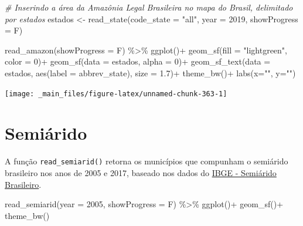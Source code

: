 \documentclass[
  brazilian,
]{book}
\newenvironment{Shaded}{\begin{snugshade}}{\end{snugshade}}
\newcommand{\AttributeTok}[1]{\textcolor[rgb]{0.77,0.63,0.00}{#1}}
\newcommand{\CommentTok}[1]{\textcolor[rgb]{0.56,0.35,0.01}{\textit{#1}}}
\newcommand{\DecValTok}[1]{\textcolor[rgb]{0.00,0.00,0.81}{#1}}
\newcommand{\FloatTok}[1]{\textcolor[rgb]{0.00,0.00,0.81}{#1}}
\newcommand{\FunctionTok}[1]{\textcolor[rgb]{0.00,0.00,0.00}{#1}}
\newcommand{\NormalTok}[1]{#1}
\newcommand{\OtherTok}[1]{\textcolor[rgb]{0.56,0.35,0.01}{#1}}
\newcommand{\SpecialCharTok}[1]{\textcolor[rgb]{0.00,0.00,0.00}{#1}}
\newcommand{\StringTok}[1]{\textcolor[rgb]{0.31,0.60,0.02}{#1}}
\begin{document}
\begin{Shaded}
\begin{Highlighting}[]
\CommentTok{\# Inserindo a área da Amazônia Legal Brasileira no mapa do Brasil, delimitado por estados}
\NormalTok{estados }\OtherTok{\textless{}{-}} \FunctionTok{read\_state}\NormalTok{(}\AttributeTok{code\_state =} \StringTok{"all"}\NormalTok{,}
                      \AttributeTok{year =} \DecValTok{2019}\NormalTok{,}
                      \AttributeTok{showProgress =}\NormalTok{ F)}

\FunctionTok{read\_amazon}\NormalTok{(}\AttributeTok{showProgress =}\NormalTok{ F) }\SpecialCharTok{\%\textgreater{}\%}
  \FunctionTok{ggplot}\NormalTok{()}\SpecialCharTok{+}
  \FunctionTok{geom\_sf}\NormalTok{(}\AttributeTok{fill =} \StringTok{"lightgreen"}\NormalTok{, }\AttributeTok{color =} \DecValTok{0}\NormalTok{)}\SpecialCharTok{+}
  \FunctionTok{geom\_sf}\NormalTok{(}\AttributeTok{data =}\NormalTok{ estados, }\AttributeTok{alpha =} \DecValTok{0}\NormalTok{)}\SpecialCharTok{+}
  \FunctionTok{geom\_sf\_text}\NormalTok{(}\AttributeTok{data =}\NormalTok{ estados, }\FunctionTok{aes}\NormalTok{(}\AttributeTok{label =}\NormalTok{ abbrev\_state), }\AttributeTok{size =} \FloatTok{1.7}\NormalTok{)}\SpecialCharTok{+}
  \FunctionTok{theme\_bw}\NormalTok{()}\SpecialCharTok{+}
  \FunctionTok{labs}\NormalTok{(}\AttributeTok{x=}\StringTok{""}\NormalTok{, }\AttributeTok{y=}\StringTok{""}\NormalTok{)}
\end{Highlighting}
\end{Shaded}

\begin{center}\texttt{[image: \_main\_files/figure-latex/unnamed-chunk-363-1]} \end{center}

\hypertarget{semiuxe1rido}{%
\section{Semiárido}\label{semiuxe1rido}}

A função \texttt{read\_semiarid()} retorna os municípios que compunham o semiárido brasileiro nos anos de 2005 e 2017, baseado nos dados do \href{https://www.ibge.gov.br/geociencias/cartas-e-mapas/mapas-regionais/15974-semiarido-brasileiro.html?=\&t=downloads}{IBGE - Semiárido Brasileiro}.

\begin{Shaded}
\begin{Highlighting}[]
\FunctionTok{read\_semiarid}\NormalTok{(}\AttributeTok{year =} \DecValTok{2005}\NormalTok{,}
              \AttributeTok{showProgress =}\NormalTok{ F) }\SpecialCharTok{\%\textgreater{}\%} 
  \FunctionTok{ggplot}\NormalTok{()}\SpecialCharTok{+}
  \FunctionTok{geom\_sf}\NormalTok{()}\SpecialCharTok{+}
  \FunctionTok{theme\_bw}\NormalTok{()}
\end{Highlighting}
\end{Shaded}
\end{document}
